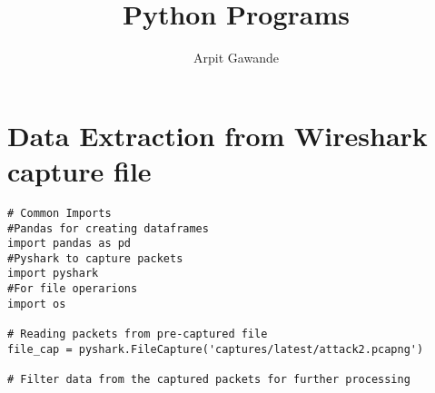 \documentclass{article}
\begin{document}
\title{Python Programs}
\author{Arpit Gawande}
\maketitle
\newpage
\section{Data Extraction from Wireshark capture file}
\begin{verbatim}
# Common Imports
#Pandas for creating dataframes
import pandas as pd
#Pyshark to capture packets
import pyshark
#For file operarions
import os

# Reading packets from pre-captured file
file_cap = pyshark.FileCapture('captures/latest/attack2.pcapng')

# Filter data from the captured packets for further processing


\end{verbatim}
\end{document}
